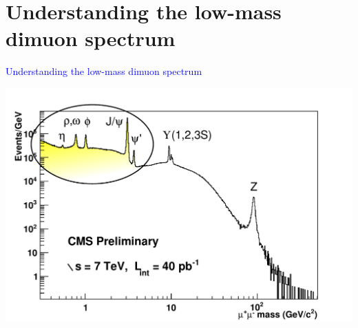 \documentclass[compress]{beamer}
\begin{document}
\section*{Understanding the low-mass dimuon spectrum}
\begin{frame}
\vspace{0.75 cm}
\begin{center}
\Huge \textcolor{blue}{Understanding the low-mass dimuon spectrum}

\vspace{0.25 cm}
\includegraphics[width=0.75\linewidth]{dimuonSpectrum_40pb-1.pdf}
\end{center}
\end{frame}
\end{document}
